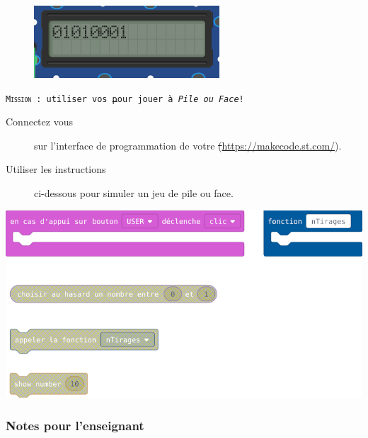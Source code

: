 


%
%
\begin{figure}
    \includegraphics[width=\linewidth]{res/st-pf-00.png}
\end{figure}

\begin{eleve}    
    \texttt{\textsc{Mission} : utiliser vos \st pour jouer à \emph{Pile ou Face}!}
    
    \begin{description}
        \item [Connectez vous] sur l'interface de programmation de votre \st (\url{https://makecode.st.com/}).
        \item [Utiliser les instructions] ci-dessous pour simuler un jeu de pile ou face.
    \end{description}
    
    \centerline{\includegraphics[width=0.75\linewidth]{res/st-pf-00-eleve.png}}
\end{eleve}
%
%

\subsubsection{Notes pour l'enseignant}


